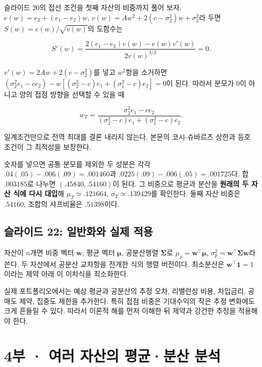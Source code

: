 \documentclass[11pt,a4paper]{article}
\begin{document}
슬라이드 20의 접선 조건을 첫째 자산의 비중까지 풀어 보자. $e(w)=e_2+(e_1-e_2)w$, $v(w)=Aw^2+2(c-\sigma_2^2)w+\sigma_2^2$라 두면 $S(w)=e(w)/\sqrt{v(w)}$의 도함수는
\par

\[
S'(w)=\frac{2(e_1-e_2)v(w)-e(w)v'(w)}{2v(w)^{3/2}}=0.
\]

$v'(w)=2Aw+2(c-\sigma_2^2)$를 넣고 $w^2$항을 소거하면 $(\sigma_2^2e_1-ce_2)-w[(\sigma_2^2-c)e_1+(\sigma_1^2-c)e_2]=0$이 된다. 따라서 분모가 0이 아니고 양의 접점 방향을 선택할 수 있을 때
\par

\[
w_T=\frac{\sigma_2^2e_1-ce_2}
{(\sigma_2^2-c)e_1+(\sigma_1^2-c)e_2}.
\]

일계조건만으로 전역 최대를 결론 내리지 않는다. 본문의 코시-슈바르츠 상한과 등호 조건이 그 최적성을 보장한다.
\par

숫자를 넣으면 공통 분모를 제외한 두 성분은 각각 $.04(.05)-.006(.09)=.001460$과 $.0225(.09)-.006(.05)=.001725$다. 합 $.003185$로 나누면 $(.45840,.54160)$이 된다. 그 비중으로 평균과 분산을 \textbf{원래의 두 자산 식에 다시 대입}해 $\mu_T\simeq.121664$, $\sigma_T\simeq.139429$를 확인한다. 둘째 자산 비중은 $.54160$, 조합의 샤프비율은 $.51398$이다.
\par

\subsection{슬라이드 22: 일반화와 실제 적용}

자산이 $n$개면 비중 벡터 $\boldsymbol{w}$, 평균 벡터 $\boldsymbol{\mu}$, 공분산행렬 $\boldsymbol{\Sigma}$로 $\mu_p=\boldsymbol{w}^\top\boldsymbol{\mu}$, $\sigma_p^2=\boldsymbol{w}^\top\boldsymbol{\Sigma}\boldsymbol{w}$라 쓴다. 두 자산에서 공분산 교차항을 전개한 식의 행렬 버전이다. 최소분산은 $\boldsymbol{w}^\top\boldsymbol{1}=1$이라는 제약 아래 이 이차식을 최소화한다.
\par

실제 포트폴리오에서는 예상 평균과 공분산의 추정 오차, 리밸런싱 비용, 차입금리, 공매도 제약, 집중도 제한을 추가한다. 특히 접점 비중은 기대수익의 작은 추정 변화에도 크게 흔들릴 수 있다. 따라서 이론적 해를 먼저 이해한 뒤 제약과 강건한 추정을 적용해야 한다.
\par

\clearpage

\section{4부 · 여러 자산의 평균·분산 분석}
\end{document}

